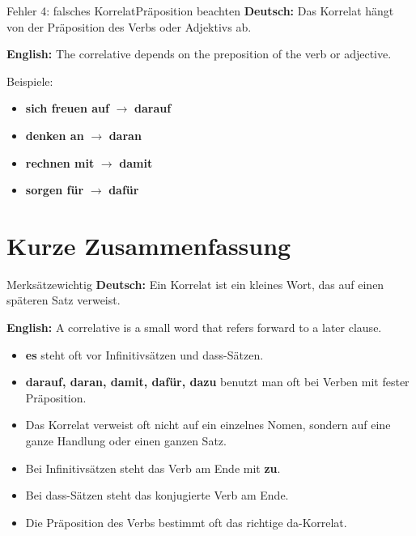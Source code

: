 \documentclass[a4paper,11pt]{article}
\newcommand{\GermanText}[1]{\textbf{Deutsch: }#1\par}
\newcommand{\EnglishText}[1]{{\small\color{SoftGray}\textbf{English: }#1\par}}
\begin{document}
        \begin{grammarentry}{Fehler 4: falsches Korrelat}{Präposition beachten}
            \GermanText{Das Korrelat hängt von der Präposition des Verbs oder Adjektivs ab.}
            \EnglishText{The correlative depends on the preposition of the verb or adjective.}
            
            Beispiele:
            \begin{itemize}
                \item \textbf{sich freuen auf} $\rightarrow$ \textbf{darauf}
                \item \textbf{denken an} $\rightarrow$ \textbf{daran}
                \item \textbf{rechnen mit} $\rightarrow$ \textbf{damit}
                \item \textbf{sorgen für} $\rightarrow$ \textbf{dafür}
            \end{itemize}
        \end{grammarentry}
    
    
    \section{Kurze Zusammenfassung}
        
        \begin{grammarentry}{Merksätze}{wichtig}
            \GermanText{Ein Korrelat ist ein kleines Wort, das auf einen späteren Satz verweist.}
            \EnglishText{A correlative is a small word that refers forward to a later clause.}
            
            \begin{itemize}
                \item \textbf{es} steht oft vor Infinitivsätzen und dass-Sätzen.
                \item \textbf{darauf, daran, damit, dafür, dazu} benutzt man oft bei Verben mit fester Präposition.
                \item Das Korrelat verweist oft nicht auf ein einzelnes Nomen, sondern auf eine ganze Handlung oder einen ganzen Satz.
                \item Bei Infinitivsätzen steht das Verb am Ende mit \textbf{zu}.
                \item Bei dass-Sätzen steht das konjugierte Verb am Ende.
                \item Die Präposition des Verbs bestimmt oft das richtige da-Korrelat.
            \end{itemize}
        \end{grammarentry}
        
\end{document}
